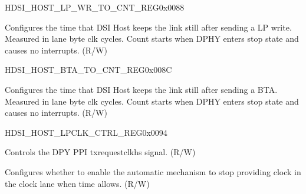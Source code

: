 \begin{register}{H}{DSI\_HOST\_LP\_WR\_TO\_CNT\_REG}{0x0088}\label{regdesc:DSIHOSTLPWRTOCNTREG}
%
%
\regnewline%
\begin{regdesc}\begin{reglist}
\label{fielddesc:DSIHOSTLPWRTOCNT}\item [DSI\_HOST\_LP\_WR\_TO\_CNT] Configures the time that DSI Host keeps the link still after sending a LP write. Measured in lane byte clk cycles. Count starts when DPHY enters stop state and causes no interrupts. (R/W)
\end{reglist}\end{regdesc}
\end{register}


\begin{register}{H}{DSI\_HOST\_BTA\_TO\_CNT\_REG}{0x008C}\label{regdesc:DSIHOSTBTATOCNTREG}
%
%
\regnewline%
\begin{regdesc}\begin{reglist}
\label{fielddesc:DSIHOSTBTATOCNT}\item [DSI\_HOST\_BTA\_TO\_CNT] Configures the time that DSI Host keeps the link still after sending a BTA. Measured in lane byte clk cycles. Count starts when DPHY enters stop state and causes no interrupts. (R/W)
\end{reglist}\end{regdesc}
\end{register}




\begin{register}{H}{DSI\_HOST\_LPCLK\_CTRL\_REG}{0x0094}\label{regdesc:DSIHOSTLPCLKCTRLREG}
%
%
%
\regnewline%
\begin{regdesc}\begin{reglist}
\label{fielddesc:DSIHOSTPHYTXREQUESTCLKHS}\item [DSI\_HOST\_PHY\_TXREQUESTCLKHS] Controls the DPY PPI txrequestclkhs signal. (R/W)
\label{fielddesc:DSIHOSTAUTOCLKLANECTRL}\item [DSI\_HOST\_AUTO\_CLKLANE\_CTRL] Configures whether to enable the automatic mechanism to stop providing clock in the clock lane when time allows. (R/W)
\end{reglist}\end{regdesc}
\end{register}


